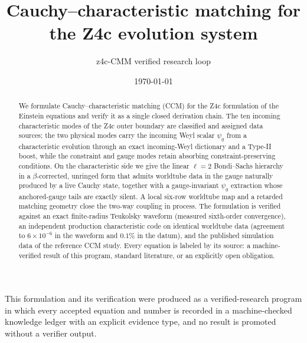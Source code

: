 \documentclass[aps,prd,amsmath,floats,floatfix,onecolumn,compact,superscriptaddress,nofootinbib]{revtex4-2}
\begin{document}
\title{Cauchy--characteristic matching for the Z4c evolution system}

\author{z4c-CMM verified research loop}

\date{\today}

\begin{abstract}
We formulate Cauchy--characteristic matching (CCM) for the Z4c
formulation of the Einstein equations and verify it as a single closed
derivation chain. The ten incoming characteristic modes of the Z4c outer
boundary are classified and assigned data sources; the two physical
modes carry the incoming Weyl scalar $\psi_0$ from a characteristic
evolution through an exact incoming-Weyl dictionary and a Type-II boost,
while the constraint and gauge modes retain absorbing
constraint-preserving conditions. On the characteristic side we give the
linear $\ell=2$ Bondi--Sachs hierarchy in a $\beta$-corrected, unringed
form that admits worldtube data in the gauge naturally produced by a
live Cauchy state, together with a gauge-invariant $\psi_0$ extraction
whose anchored-gauge tails are exactly silent. A local six-row worldtube
map and a retarded matching geometry close the two-way coupling in
process. The formulation is verified against an exact finite-radius
Teukolsky waveform (measured sixth-order convergence), an independent
production characteristic code on identical worldtube data (agreement to
$6\times10^{-6}$ in the waveform and $0.1\%$ in the datum), and the
published simulation data of the reference CCM study. Every equation is
labeled by its source: a machine-verified result of this program,
standard literature, or an explicitly open obligation.
\end{abstract}

\maketitle








\begin{acknowledgments}
This formulation and its verification were produced as a verified-research
program in which every accepted equation and number is recorded in a
machine-checked knowledge ledger with an explicit evidence type, and no
result is promoted without a verifier output.
\end{acknowledgments}
\end{document}
